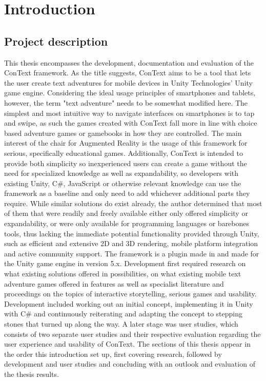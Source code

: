
\chapter{Introduction}\label{chapter:introduction}

\section{Project description}
This thesis encompasses the development, documentation and evaluation of the ConText framework. As the title suggests, ConText aims to be a tool that lets the user create text adventures for mobile devices in Unity Technologies' Unity game engine. Considering the ideal usage principles of smartphones and tablets, however, the term "text adventure" needs to be somewhat modified here. The simplest and most intuitive way to navigate interfaces on smartphones is to tap and swipe, as such the games created with ConText fall more in line with choice based adventure games or gamebooks in how they are controlled. The main interest of the chair for Augmented Reality is the usage of this framework for serious, specifically educational games. Additionally, ConText is intended to provide both simplicity so inexperienced users can create a game without the need for specialized knowledge as well as expandability, so developers with existing Unity, C\#, JavaScript or otherwise relevant knowledge can use the framework as a baseline and only need to add whichever additional parts they require. 
While similar solutions do exist already, the author determined that most of them that were readily and freely available either only offered simplicity or expandability, or were only available for programming languages or barebones tools, thus lacking the immediate potential functionality provided through Unity, such as efficient and extensive 2D and 3D rendering, mobile platform integration and active community support. 
The framework is a plugin made in and made for the Unity game engine in version 5.x. Development first required research on what existing solutions offered in possibilities, on what existing mobile text adventure games offered in features as well as specialist literature and proceedings on the topics of interactive storytelling, serious games and usability. Development included working out an initial concept, implementing it in Unity with C\# and continuously reiterating and adapting the concept to stepping stones that turned up along the way. 
A later stage was user studies, which consists of two separate user studies and their respective evaluation regarding the user experience and usability of ConText.
The sections of this thesis appear in the order this introduction set up, first covering research, followed by development and user studies and concluding with an outlook and evaluation of the thesis results.

